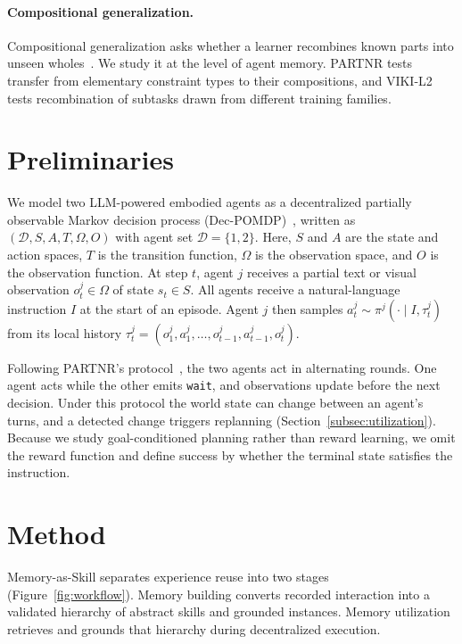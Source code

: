 \documentclass{article}
\theoremstyle{plain}
\theoremstyle{definition}
\theoremstyle{remark}
\begin{document}
\paragraph{Compositional generalization.}
Compositional generalization asks whether a learner recombines known parts into unseen wholes~\citep{lake2018generalization,keysers2020measuring,hupkes2020compositionality}. We study it at the level of agent memory. PARTNR tests transfer from elementary constraint types to their compositions, and VIKI-L2 tests recombination of subtasks drawn from different training families.
 
 
\section{Preliminaries}

We model two LLM-powered embodied agents as a decentralized partially observable Markov decision process (Dec-POMDP)~\citep{oliehoek2016concise}, written as $(\mathcal{D},S,A,T,\Omega,O)$ with agent set $\mathcal{D}=\{1,2\}$. Here, $S$ and $A$ are the state and action spaces, $T$ is the transition function, $\Omega$ is the observation space, and $O$ is the observation function. At step $t$, agent $j$ receives a partial text or visual observation $o_t^j\in\Omega$ of state $s_t\in S$. All agents receive a natural-language instruction $I$ at the start of an episode. Agent $j$ then samples $a_t^j\sim\pi^j(\cdot\mid I,\tau_t^j)$ from its local history $\tau_t^j=(o_1^j,a_1^j,\ldots,o_{t-1}^j,a_{t-1}^j,o_t^j)$.

Following PARTNR's protocol~\citep{PARTNR}, the two agents act in alternating rounds. One agent acts while the other emits \texttt{wait}, and observations update before the next decision. Under this protocol the world state can change between an agent's turns, and a detected change triggers replanning (Section~\ref{subsec:utilization}). Because we study goal-conditioned planning rather than reward learning, we omit the reward function and define success by whether the terminal state satisfies the instruction.
 
 
\section{Method}
\label{sec:method}
 
Memory-as-Skill separates experience reuse into two stages (Figure~\ref{fig:workflow}). Memory building converts recorded interaction into a validated hierarchy of abstract skills and grounded instances. Memory utilization retrieves and grounds that hierarchy during decentralized execution.
\end{document}
